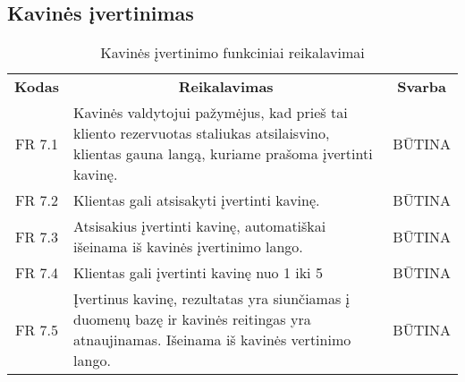 \documentclass{VUMIFPSkursinis}
\begin{document}
\subsection{Kavinės įvertinimas}
\begin{center}
	\begin{table}[H]
	\begin{tabular}{|p{2cm}|p{}|p{}|}
	
	\hline
	    \rowcolor{lightgray}
		\multicolumn{3}{|c|}{Kavinės įvertinimas}\\
		
	\hline
		\multicolumn{1}{|c|}{{\bfseries Kodas}}&
		\multicolumn{1}{|c|}{{\bfseries Reikalavimas}}&
		\multicolumn{1}{|c|}{{\bfseries Svarba}}\\

	\hline
	
		\multicolumn{1}{|c|}{FR 7.1}&
		{Kavinės valdytojui pažymėjus, kad prieš tai kliento rezervuotas staliukas atsilaisvino, klientas gauna langą, kuriame prašoma įvertinti kavinę.}&
		\multicolumn{1}{|c|}{BŪTINA}\\				
	\hline
	
		\multicolumn{1}{|c|}{FR 7.2}&
		{Klientas gali atsisakyti įvertinti kavinę.}&
		\multicolumn{1}{|c|}{BŪTINA}\\				
	\hline
	
		\multicolumn{1}{|c|}{FR 7.3}&
		{Atsisakius įvertinti kavinę, automatiškai išeinama iš kavinės įvertinimo lango.}&
		\multicolumn{1}{|c|}{BŪTINA}\\				
	\hline
	
		\multicolumn{1}{|c|}{FR 7.4}&
		{Klientas gali įvertinti kavinę nuo 1 iki 5}&
		\multicolumn{1}{|c|}{BŪTINA}\\				
	\hline
	
		\multicolumn{1}{|c|}{FR 7.5}&
		{Įvertinus kavinę, rezultatas yra siunčiamas į duomenų bazę ir kavinės reitingas yra atnaujinamas. Išeinama iš kavinės vertinimo lango.}&
		\multicolumn{1}{|c|}{BŪTINA}\\				
	\hline	
	
	\end{tabular}		
	\caption{Kavinės įvertinimo funkciniai reikalavimai}
	\label{table:KavinėsĮvertinimas}
	\end{table}


\end{center}
\pagebreak
\end{document}

